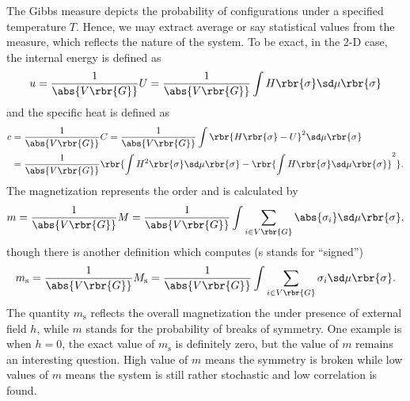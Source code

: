 \documentclass[english, nochinese]{pnote}
\begin{document}
The Gibbs measure depicts the probability of configurations under a specified temperature $T$. Hence, we may extract average or say statistical values from the measure, which reflects the nature of the system. To be exact, in the 2-D case, the internal energy is defined as
\begin{equation}
u = \frac{1}{\abs{ V \rbr{G} }} U = \frac{1}{\abs{ V \rbr{G} }} \int H \rbr{\sigma} \sd \mu \rbr{\sigma}
\end{equation}
and the specific heat is defined as
\begin{equation}
\begin{split}
c &= \frac{1}{\abs{ V \rbr{G} }} C = \frac{1}{\abs{ V \rbr{G} }} \int \rbr{ H \rbr{\sigma} - U }^2 \sd \mu \rbr{\sigma} \\
&= \frac{1}{\abs{ V \rbr{G} }} \rbr{ \int H^2 \rbr{\sigma} \sd \mu \rbr{\sigma} - \rbr{ \int H \rbr{\sigma} \sd \mu \rbr{\sigma} }^2 }.
\end{split}
\end{equation}
The magnetization represents the order and is calculated by
\begin{equation}
m = \frac{1}{\abs{ V \rbr{G} }} M = \frac{1}{\abs{ V \rbr{G} }} \int \sum_{ i \in V \rbr{G} } \abs{\sigma_i} \sd \mu \rbr{\sigma},
\end{equation}
though there is another definition which computes (s stands for ``signed'')
\begin{equation}
m_{\text{s}} = \frac{1}{\abs{ V \rbr{G} }} M_{\text{s}} = \frac{1}{\abs{ V \rbr{G} }} \int \sum_{ i \in V \rbr{G} } \sigma_i \sd \mu \rbr{\sigma}.
\end{equation}
The quantity $m_{\text{s}}$ reflects the overall magnetization the under presence of external field $h$, while $m$ stands for the probability of breaks of symmetry. One example is when $ h = 0 $, the exact value of $m_{\text{s}}$ is definitely zero, but the value of $m$ remains an interesting question. High value of $m$ means the symmetry is broken while low values of $m$ means the system is still rather stochastic and low correlation is found.
\end{document}
